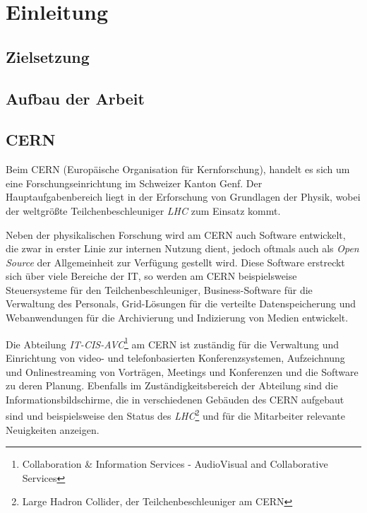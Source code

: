\chapter{Einleitung}



\section{Zielsetzung}



\section{Aufbau der Arbeit}



\section{CERN}

Beim CERN (Europäische Organisation für Kernforschung), handelt es sich um eine
Forschungseinrichtung im Schweizer Kanton Genf. Der Hauptaufgabenbereich liegt in der Erforschung
von Grundlagen der Physik, wobei der weltgrößte Teilchenbeschleuniger \emph{LHC} zum Einsatz kommt.

Neben der physikalischen Forschung wird am CERN auch Software entwickelt, die zwar in erster Linie
zur internen Nutzung dient, jedoch oftmals auch als \emph{Open Source} der Allgemeinheit zur Verfügung
gestellt wird. Diese Software erstreckt sich über viele Bereiche der IT, so werden am CERN
beispielsweise Steuersysteme für den Teilchenbeschleuniger, Business-Software für die Verwaltung des
Personals, Grid-Lösungen für die verteilte Datenspeicherung und Webanwendungen für die Archivierung
und Indizierung von Medien entwickelt.

Die Abteilung \emph{IT-CIS-AVC}\footnote{Collaboration \& Information Services - AudioVisual and
Collaborative Services} am CERN ist zuständig für die Verwaltung und Einrichtung von video- und
telefonbasierten Konferenzsystemen, Aufzeichnung und Onlinestreaming von Vorträgen, Meetings und
Konferenzen und die Software zu deren Planung. Ebenfalls im Zuständigkeitsbereich der Abteilung sind
die Informationsbildschirme, die in verschiedenen Gebäuden des CERN aufgebaut sind und beispielsweise
den Status des \emph{LHC}\footnote{Large Hadron Collider, der Teilchenbeschleuniger am CERN} und
für die Mitarbeiter relevante Neuigkeiten anzeigen.


